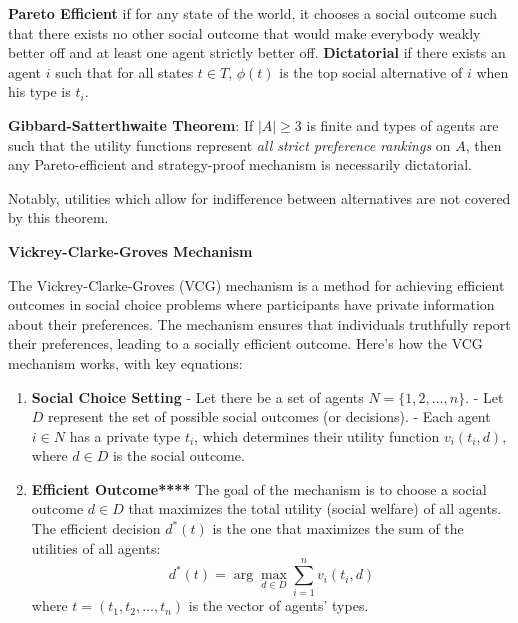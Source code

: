 \documentclass[10pt]{scrartcl}
\newcommand{\vocab}[1]{\textbf{\color{blue} #1}}
\renewcommand{\section}[1]{\begin{center}\textbf{\color{red}#1}\end{center}}
\begin{document}
\begin{multicols*}{2}
    \vocab{Pareto Efficient} if for any state of the world, it chooses a social outcome
    such that there exists no other social outcome that would
    make everybody weakly better off and at least one agent strictly better off.
    \vocab{Dictatorial} if there exists an agent $i$ such that for all
    states $t \in T$, $\phi(t)$ is the top social alternative of $i$ when his type is $t_i$.

    \vocab{Gibbard-Satterthwaite Theorem}: If $|A| \geq 3$ is finite and types of agents
    are such that the utility functions represent \emph{all strict preference rankings} on $A$,
    then any Pareto-efficient and strategy-proof mechanism is necessarily dictatorial.

    Notably, utilities which allow for indifference
    between alternatives are not covered by this theorem.

    \section{Vickrey-Clarke-Groves Mechanism}
    The Vickrey-Clarke-Groves (VCG) mechanism is a method for achieving efficient outcomes in social choice problems where participants have private information about their preferences. The mechanism ensures that individuals truthfully report their preferences, leading to a socially efficient outcome. Here's how the VCG mechanism works, with key equations:
    \begin{enumerate}
        \item \vocab{Social Choice Setting}
        - Let there be a set of agents \( N = \{1, 2, \dots, n\} \).
        - Let \( D \) represent the set of possible social outcomes (or decisions).
        - Each agent \( i \in N \) has a private type \( t_i \), which determines their utility function \( v_i(t_i, d) \), where \( d \in D \) is the social outcome.

        \item \vocab{Efficient Outcome****}
        The goal of the mechanism is to choose a social outcome \( d \in D \) that maximizes the total utility (social welfare) of all agents. The efficient decision \( d^*(t) \) is the one that maximizes the sum of the utilities of all agents:
        \[
        d^*(t) = \arg \max_{d \in D} \sum_{i=1}^{n} v_i(t_i, d)
        \]
        where \( t = (t_1, t_2, \dots, t_n) \) is the vector of agents' types.


\end{enumerate}
\end{multicols*}
\end{document}
